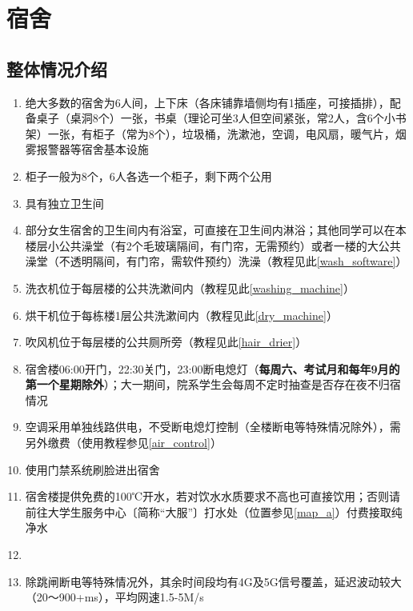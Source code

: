 \chapter[宿舍]{宿舍}
\section[整体情况介绍]{整体情况介绍}
\begin{enumerate}
      \item 绝大多数的宿舍为6人间，上下床（各床铺靠墙侧均有1插座，可接插排），配备桌子（桌洞8个）一张，书桌（理论可坐3人但空间紧张，常2人，含6个小书架）一张，有柜子（常为8个），垃圾桶，洗漱池，空调，电风扇，暖气片，烟雾报警器等宿舍基本设施
      \item 柜子\footnotemark 一般为8个，6人各选一个柜子，剩下两个公用
      \item 具有独立卫生间
      \item 部分女生宿舍的卫生间内有浴室，可直接在卫生间内淋浴；其他同学可以在本楼层小公共澡堂（有2个毛玻璃隔间，有门帘，无需预约）或者一楼的大公共澡堂（不透明隔间，有门帘，需软件预约）洗澡（教程见此\uline{\ref{wash_software}}）
      \item 洗衣机位于每层楼的公共洗漱间内（教程见此\uline{\ref{washing_machine}}）
      \item 烘干机位于每栋楼1层公共洗漱间内（教程见此\uline{\ref{dry_machine}}）
      \item 吹风机位于每层楼的公共厕所旁（教程见此\uline{\ref{hair_drier}}）
      \item 宿舍楼06:00开门，22:30关门，23:00断电熄灯（\textbf{每周六、考试月和每年9月的第一个星期除外}）；大一期间，院系学生会每周不定时抽查是否存在夜不归宿情况
      \item 空调采用单独线路供电，不受断电熄灯控制（全楼断电等特殊情况除外），需另外缴费（使用教程参见\uline{\ref{air_control}}）
      \item 使用门禁系统刷脸进出宿舍
      \item 宿舍楼提供免费的100℃开水\footnotemark，若对饮水水质要求不高也可直接饮用；否则请前往大学生服务中心〔简称“大服”〕打水处（位置参见\uline{\ref{map_a}}）付费接取纯净水
      \item \textbf{}
      \item 除跳闸断电等特殊情况外，其余时间段均有4G及5G信号覆盖，延迟波动较大（20～900+ms），平均网速1.5-5M/s
\end{enumerate}

